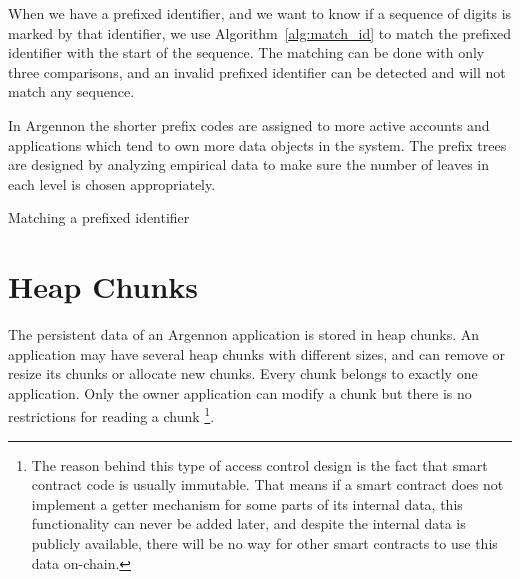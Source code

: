 When we have a prefixed identifier, and we want to know if a sequence of digits is marked by that identifier,
we use Algorithm~\ref{alg:match_id} to match the prefixed identifier with the start of the sequence. The matching
can be done with only three comparisons, and an invalid prefixed identifier can be detected and will not match
any sequence.

In Argennon the shorter prefix codes are assigned to more active accounts and applications which tend to own more
data objects in the system. The prefix trees are designed by analyzing empirical data to make sure the number
of leaves in each level is chosen appropriately.

\begin{algorithm}[h]
    \DontPrintSemicolon
    \BlankLine
    \BlankLine
    {
        {
            \;
        }
    }
    \;
    \caption{Matching a prefixed identifier}\label{alg:match_id}
\end{algorithm}


\section{Heap Chunks}\label{heap}

The persistent data of an Argennon application is stored in heap chunks. An application may have several heap chunks
with different sizes, and can remove or
resize its chunks or allocate new chunks. Every chunk belongs to exactly one application. Only the owner application can
modify a chunk but there is no restrictions for reading a chunk \footnote{The reason behind this type of access
control design is the fact that smart contract
code is usually immutable. That means if a smart contract does not implement a
getter mechanism for some parts of its internal data, this functionality can never
be added later, and despite the internal data is publicly available, there will be no
way for other smart contracts to use this data on-chain.}.

